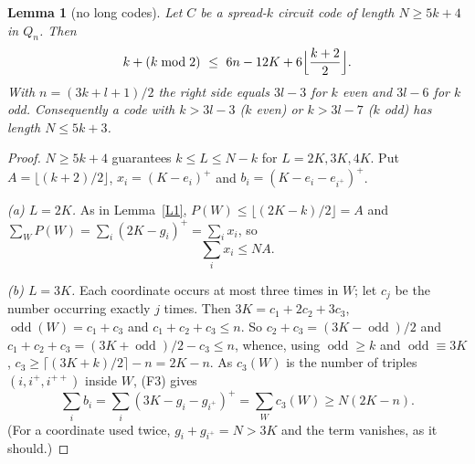 \documentclass[11pt]{article}
\newtheorem{lemma}{Lemma}
\theoremstyle{remark}
\newcommand{\odd}{\operatorname{odd}}
\newcommand{\pos}[1]{(#1)^{+}}
\begin{document}
\begin{lemma}[no long codes]\label{L2}
Let $C$ be a spread-$k$ circuit code of length $N\ge 5k+4$ in $Q_n$. Then
\[ k+(k\bmod 2)\ \le\ 6n-12K+6\Bigl\lfloor\frac{k+2}{2}\Bigr\rfloor . \]
With $n=(3k+l+1)/2$ the right side equals $3l-3$ for $k$ even and $3l-6$ for $k$ odd. Consequently a code with
$k>3l-3$ ($k$ even) or $k>3l-7$ ($k$ odd) has length $N\le 5k+3$.
\end{lemma}
\begin{proof}
$N\ge 5k+4$ guarantees $k\le L\le N-k$ for $L=2K,3K,4K$. Put $A=\lfloor (k+2)/2\rfloor$,
$x_i=\pos{K-e_i}$ and $b_i=\pos{K-e_i-e_{i^+}}$.

\emph{(a) $L=2K$.} As in Lemma~\ref{L1}, $P(W)\le\lfloor(2K-k)/2\rfloor=A$ and
$\sum_WP(W)=\sum_i\pos{2K-g_i}=\sum_ix_i$, so
\begin{equation}\label{e1}\sum_i x_i\le NA.\end{equation}

\emph{(b) $L=3K$.} Each coordinate occurs at most three times in $W$; let $c_j$ be the number occurring exactly $j$ times.
Then $3K=c_1+2c_2+3c_3$, $\odd(W)=c_1+c_3$ and $c_1+c_2+c_3\le n$. So $c_2+c_3=(3K-\odd)/2$ and
$c_1+c_2+c_3=(3K+\odd)/2-c_3\le n$, whence, using $\odd\ge k$ and $\odd\equiv 3K$,
$c_3\ge\lceil(3K+k)/2\rceil-n=2K-n$. As $c_3(W)$ is the number of triples $(i,i^+,i^{++})$ inside $W$, (F3) gives
\begin{equation}\label{e2}\sum_i b_i=\sum_i\pos{3K-g_i-g_{i^+}}=\sum_Wc_3(W)\ge N(2K-n).\end{equation}
(For a coordinate used twice, $g_i+g_{i^+}=N>3K$ and the term vanishes, as it should.)


\end{proof}
\end{document}
